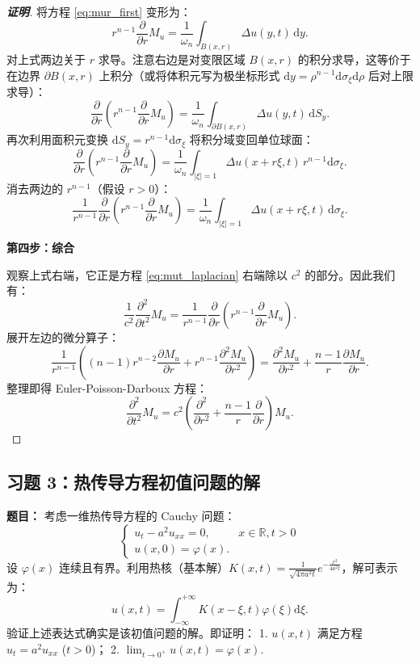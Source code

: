 \documentclass[12pt,a4paper]{ctexart}
\begin{document}
\begin{proof}[\textbf{证明}]
		将方程 \eqref{eq:mur_first} 变形为：
		\[
		r^{n-1} \frac{\partial}{\partial r} M_u = \frac{1}{\omega_n} \int_{B(x,r)} \Delta u(y, t) \, \mathrm{d}y.
		\]
		对上式两边关于 $r$ 求导。注意右边是对变限区域 $B(x,r)$ 的积分求导，这等价于在边界 $\partial B(x,r)$ 上积分（或将体积元写为极坐标形式 $\mathrm{d}y = \rho^{n-1}\mathrm{d}\sigma_\xi \mathrm{d}\rho$ 后对上限求导）：
		\[
		\frac{\partial}{\partial r} \left( r^{n-1} \frac{\partial}{\partial r} M_u \right) = \frac{1}{\omega_n} \int_{\partial B(x,r)} \Delta u(y, t) \, \mathrm{d}S_y.
		\]
		再次利用面积元变换 $\mathrm{d}S_y = r^{n-1}\mathrm{d}\sigma_\xi$ 将积分域变回单位球面：
		\[
		\frac{\partial}{\partial r} \left( r^{n-1} \frac{\partial}{\partial r} M_u \right) = \frac{1}{\omega_n} \int_{|\xi|=1} \Delta u(x+r\xi, t) \, r^{n-1} \mathrm{d}\sigma_\xi.
		\]
		消去两边的 $r^{n-1}$（假设 $r > 0$）：
		\[
		\frac{1}{r^{n-1}} \frac{\partial}{\partial r} \left( r^{n-1} \frac{\partial}{\partial r} M_u \right) = \frac{1}{\omega_n} \int_{|\xi|=1} \Delta u(x+r\xi, t) \, \mathrm{d}\sigma_\xi.
		\]
		
		\textbf{第四步：综合}
		
		观察上式右端，它正是方程 \eqref{eq:mut_laplacian} 右端除以 $c^2$ 的部分。因此我们有：
		\[
		\frac{1}{c^2} \frac{\partial^2}{\partial t^2} M_u = \frac{1}{r^{n-1}} \frac{\partial}{\partial r} \left( r^{n-1} \frac{\partial}{\partial r} M_u \right).
		\]
		展开左边的微分算子：
		\[
		\frac{1}{r^{n-1}} \left( (n-1)r^{n-2} \frac{\partial M_u}{\partial r} + r^{n-1} \frac{\partial^2 M_u}{\partial r^2} \right) = \frac{\partial^2 M_u}{\partial r^2} + \frac{n-1}{r} \frac{\partial M_u}{\partial r}.
		\]
		整理即得 Euler-Poisson-Darboux 方程：
		\[
		\frac{\partial^2}{\partial t^2} M_u = c^2 \left( \frac{\partial^2}{\partial r^2} + \frac{n-1}{r} \frac{\partial}{\partial r} \right) M_u.
		\]
	\end{proof}
	
	
	\subsection*{习题 3：热传导方程初值问题的解}
	
	\textbf{题目：}
	考虑一维热传导方程的 Cauchy 问题：
	\begin{equation}
		\begin{cases}
			u_t - a^2 u_{xx} = 0, & x \in \mathbb{R}, t > 0 \\
			u(x, 0) = \varphi(x). &
		\end{cases}
	\end{equation}
	设 $\varphi(x)$ 连续且有界。利用热核（基本解）$K(x,t) = \frac{1}{\sqrt{4\pi a^2 t}} e^{-\frac{x^2}{4a^2 t}}$，解可表示为：
	\begin{equation}
		u(x,t) = \int_{-\infty}^{+\infty} K(x-\xi, t) \varphi(\xi) \mathrm{d}\xi.
	\end{equation}
	验证上述表达式确实是该初值问题的解。即证明：
	1. $u(x,t)$ 满足方程 $u_t = a^2 u_{xx}$ ($t>0$)；
	2. $\lim_{t \to 0^+} u(x,t) = \varphi(x)$.
	
\end{document}
